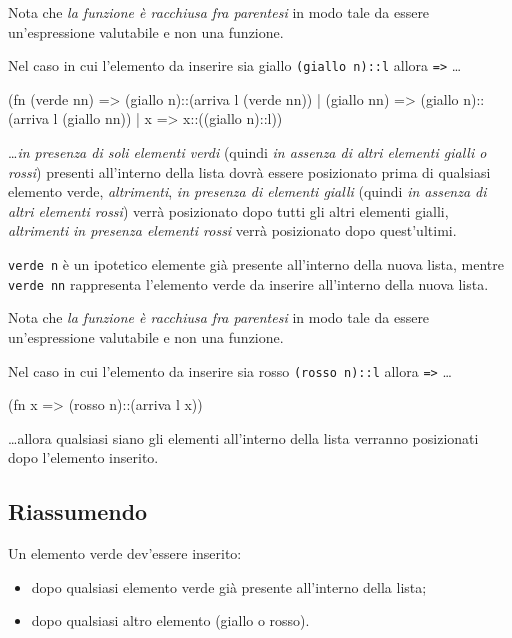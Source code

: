 Nota che \emph{la funzione è racchiusa fra parentesi} in modo tale da essere un'espressione valutabile e non una funzione.

\medskip
Nel caso in cui l'elemento da inserire sia giallo \texttt{(giallo n)::l} allora \texttt{=>} \dots

\begin{smlcode}
(fn (verde  nn) => (giallo n)::(arriva l (verde nn))
  | (giallo nn) => (giallo n)::(arriva l (giallo nn))
  | x           => x::((giallo n)::l))
\end{smlcode}

\dots \emph{in presenza di soli elementi verdi} (quindi \emph{in assenza di altri elementi gialli o rossi}) presenti all'interno della lista dovrà essere posizionato prima di qualsiasi elemento verde, %
\emph{altrimenti}, \emph{in presenza di elementi gialli} (quindi \emph{in assenza di altri elementi rossi}) verrà posizionato dopo tutti gli altri elementi gialli, %
\emph{altrimenti} \emph{in presenza elementi rossi} verrà posizionato dopo quest'ultimi.

\texttt{verde n} è un ipotetico elemente già presente all'interno della nuova lista, mentre \texttt{verde  nn} rappresenta l'elemento verde da inserire all'interno della nuova lista.

Nota che \emph{la funzione è racchiusa fra parentesi} in modo tale da essere un'espressione valutabile e non una funzione.

\medskip
Nel caso in cui l'elemento da inserire sia rosso \texttt{(rosso  n)::l} allora \texttt{=>} \dots

\begin{smlcode}
(fn x => (rosso n)::(arriva l x))
\end{smlcode}

\dots allora qualsiasi siano gli elementi all'interno della lista verranno posizionati dopo l'elemento inserito.

\subsection{Riassumendo}

Un elemento verde dev'essere inserito:

\begin{itemize}
	\item dopo qualsiasi elemento verde già presente all'interno della lista;
	\item dopo qualsiasi altro elemento (giallo o rosso).
\end{itemize}


